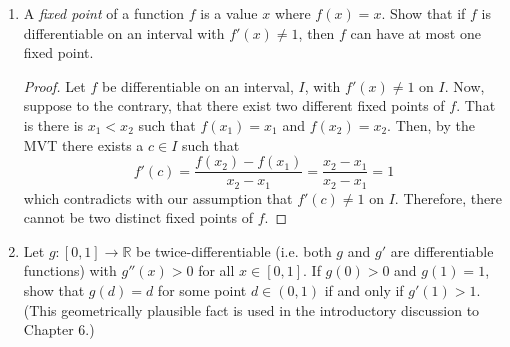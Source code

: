 \begin{enumerate}
\begin{proof}
\begin{enumerate}
    \item Following with the author, we simply apply the MVT to the function \( h(x) = [f(b)-f(a)]g(x)-[g(b)-g(a)]f(x) \). So there exists \( c \in (a,b) \) such that
    \begin{align*}
    h'(c) &= \frac{h(b)-h(a)}{b-a} \\
    &= \frac{[f(b)-f(a)]g(b)-[g(b)-g(a)]f(b)-\left( [f(b)-f(a)]g(a) - [g(b)-g(a)]f(a) \right)}{b-a} \\
    &= 0
    \end{align*}
    On the other hand, we also have that
    \begin{align*}
        h'(c) &= [f(b)-f(a)]g'(c) - [g(b)-g(a)]f'(c) \\
        \intertext{which, together with the above, gives us}
        0 &= [f(b)-f(a)]g'(c) - [g(b)-g(a)]f'(c) \\
        [g(b)-g(a)]f'(c) &= [f(b)-f(a)]g'(c)
    \end{align*}
    as desired.
    
    \item  
\end{enumerate}
\end{proof}

\item A \emph{fixed point} of a function \( f \) is a value \( x \) where \( f(x) = x \). Show that if \( f \) is differentiable on an interval with \( f'(x) \neq 1 \), then \( f \) can have at most one fixed point. 

\begin{proof}
Let \( f \) be differentiable on an interval, \( I \), with \( f'(x) \neq 1 \) on \( I \). Now, suppose to the contrary, that there exist two different fixed points of \( f \). That is there is \( x_1 < x_2 \) such that \( f(x_1) = x_1 \) and \( f(x_2)=x_2 \). Then, by the MVT there exists a \( c \in I \) such that
\[
f'(c) = \frac{f(x_2)-f(x_1)}{x_2-x_1} = \frac{x_2-x_1}{x_2-x_1} = 1
\]
which contradicts with our assumption that \( f'(c) \neq 1 \) on \( I \). Therefore, there cannot be two distinct fixed points of \( f \).
\end{proof}

\item Let \( g: [0,1] \rightarrow \mathbb{R} \) be twice-differentiable (i.e. both \( g \) and \( g' \) are differentiable functions) with \( g''(x) > 0 \) for all \( x \in [0,1] \). If \( g(0) > 0 \) and \( g(1)=1 \), show that \( g(d) = d \) for some point \( d \in (0,1) \) if and only if \( g'(1) > 1 \). (This geometrically plausible fact is used in the introductory discussion to Chapter 6.)


\end{enumerate}
